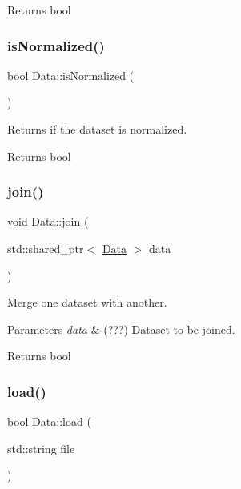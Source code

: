 \begin{DoxyReturn}{Returns}
bool 
\end{DoxyReturn}
\mbox{\label{class_data_ad96fc8e9c5ec9e40b1dc6d9670eefe0c}} 
\subsubsection{\texorpdfstring{is\+Normalized()}{isNormalized()}}
{\footnotesize\ttfamily bool Data\+::is\+Normalized (\begin{DoxyParamCaption}{ }\end{DoxyParamCaption})\hspace{0.3cm}{\ttfamily [inline]}}



Returns if the dataset is normalized. 

\begin{DoxyReturn}{Returns}
bool 
\end{DoxyReturn}
\mbox{\label{class_data_a89252c083e4dde3ea403e27604db53ea}} 
\subsubsection{\texorpdfstring{join()}{join()}}
{\footnotesize\ttfamily void Data\+::join (\begin{DoxyParamCaption}\item[{std\+::shared\+\_\+ptr$<$ \hyperlink{class_data}{Data} $>$}]{data }\end{DoxyParamCaption})}



Merge one dataset with another. 


\begin{DoxyParams}{Parameters}
{\em data} & (???) Dataset to be joined. \\
\hline
\end{DoxyParams}
\begin{DoxyReturn}{Returns}
bool 
\end{DoxyReturn}
\mbox{\label{class_data_ac2ed251251be234c607f486e16902112}} 
\subsubsection{\texorpdfstring{load()}{load()}}
{\footnotesize\ttfamily bool Data\+::load (\begin{DoxyParamCaption}\item[{std\+::string}]{file }\end{DoxyParamCaption})}



